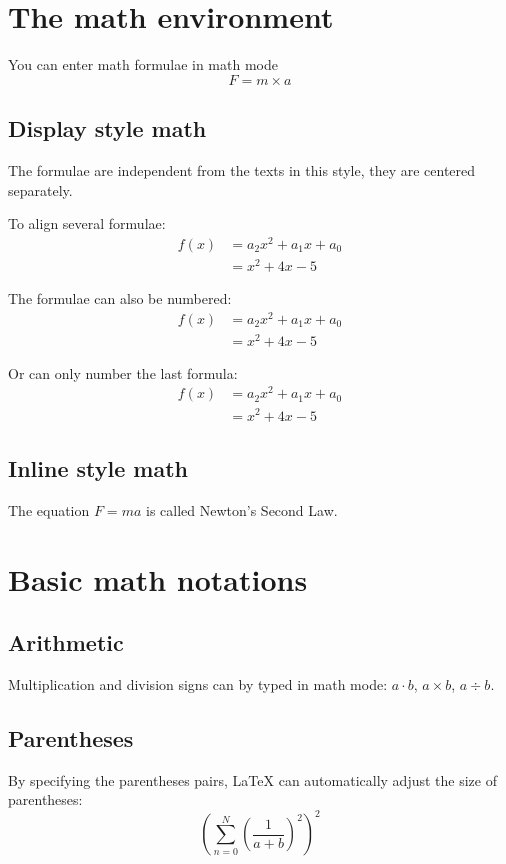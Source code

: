\documentclass[a4paper, 12pt]{article}
\begin{document}
\section{The math environment}
You can enter math formulae in math mode
\[
F = m \times a
\]
\subsection{Display style math}
The formulae are independent from the texts in this style, they are centered separately.

To align several formulae:
\begin{align*}
    f(x) & = a_2 x^2 + a_1 x + a_0 \\
         & = x^2 + 4x -5
\end{align*}

The formulae can also be numbered:
\begin{align}
    f(x) & = a_2 x^2 + a_1 x + a_0 \\
         & = x^2 + 4x -5
\end{align}

Or can only number the last formula:
\begin{align}
    f(x) & = a_2 x^2 + a_1 x + a_0 \nonumber \\
         & = x^2 + 4x -5 
\end{align}

\subsection{Inline style math}
The equation \( F = m a\) is called Newton's Second Law.

\section{Basic math notations}

\subsection{Arithmetic}
Multiplication and division signs can by typed in math mode: \(a \cdot b\), \(a \times b\), \(a \div b\).
\subsection{Parentheses}
By specifying the parentheses pairs, {\LaTeX} can automatically adjust the size of parentheses:
\[
\left( \sum_{n=0}^N \left( \frac{1}{a + b } \right)^2 \right)^2
\]
\end{document}
